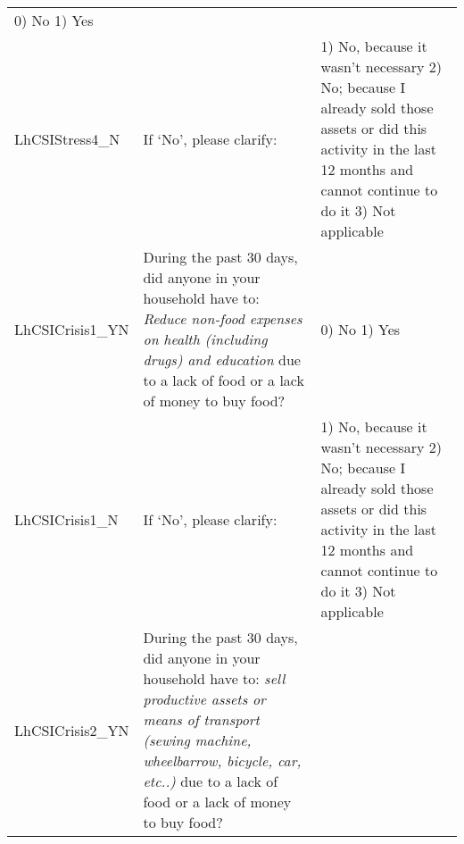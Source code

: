 \documentclass[
]{article}
\begin{document}
\begin{longtable}[]{@{}lll@{}}
\begin{minipage}[t]{0.27\columnwidth}
0) No 1) Yes\strut
\end{minipage}\tabularnewline
\begin{minipage}[t]{0.15\columnwidth}\raggedright
LhCSIStress4\_N\strut
\end{minipage} & \begin{minipage}[t]{0.49\columnwidth}\raggedright
If `No', please clarify:\strut
\end{minipage} & \begin{minipage}[t]{0.27\columnwidth}\raggedright
1) No, because it wasn't necessary 2) No; because I already sold those assets or did this activity in the last 12 months and cannot continue to do it 3) Not applicable\strut
\end{minipage}\tabularnewline
\begin{minipage}[t]{0.15\columnwidth}\raggedright
LhCSICrisis1\_YN\strut
\end{minipage} & \begin{minipage}[t]{0.49\columnwidth}\raggedright
During the past 30 days, did anyone in your household have to: \emph{Reduce non-food expenses on health (including drugs) and education } due to a lack of food or a lack of money to buy food?\strut
\end{minipage} & \begin{minipage}[t]{0.27\columnwidth}\raggedright
0) No 1) Yes\strut
\end{minipage}\tabularnewline
\begin{minipage}[t]{0.15\columnwidth}\raggedright
LhCSICrisis1\_N\strut
\end{minipage} & \begin{minipage}[t]{0.49\columnwidth}\raggedright
If `No', please clarify:\strut
\end{minipage} & \begin{minipage}[t]{0.27\columnwidth}\raggedright
1) No, because it wasn't necessary 2) No; because I already sold those assets or did this activity in the last 12 months and cannot continue to do it 3) Not applicable\strut
\end{minipage}\tabularnewline
\begin{minipage}[t]{0.15\columnwidth}\raggedright
LhCSICrisis2\_YN\strut
\end{minipage} & \begin{minipage}[t]{0.49\columnwidth}\raggedright
During the past 30 days, did anyone in your household have to: \emph{sell productive assets or means of transport (sewing machine, wheelbarrow, bicycle, car, etc..)} due to a lack of food or a lack of money to buy food?\strut

\end{minipage}
\end{longtable}
\end{document}
